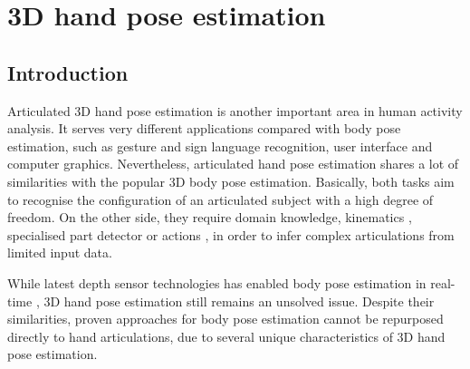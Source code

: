 \chapter{3D hand pose estimation}
\label{chap/hand}

\section{Introduction}

Articulated 3D hand pose estimation is another important area in human activity analysis. 
It serves very different applications compared with body pose estimation, such as gesture and sign language recognition, user interface and computer graphics.
Nevertheless, articulated hand pose estimation shares a lot of similarities with the popular 3D body pose estimation. Basically, both tasks aim to recognise the configuration of an articulated subject with a high degree of freedom.  
On the other side, they require domain knowledge, \eg kinematics \cite{LaGorce2011, Simo-Serra2012}, specialised part detector \cite{Bissacco2007} or actions \cite{Yao2012}, in order to infer complex articulations from limited input data. 

While latest depth sensor technologies has enabled body pose estimation in real-time \cite{Baak2011, Shotton2011, Girshick2011, Sun2012}, 3D hand pose estimation still remains an unsolved issue. Despite their similarities, proven approaches for body pose estimation cannot be repurposed directly to hand articulations, due to several unique characteristics of 3D hand pose estimation.  

